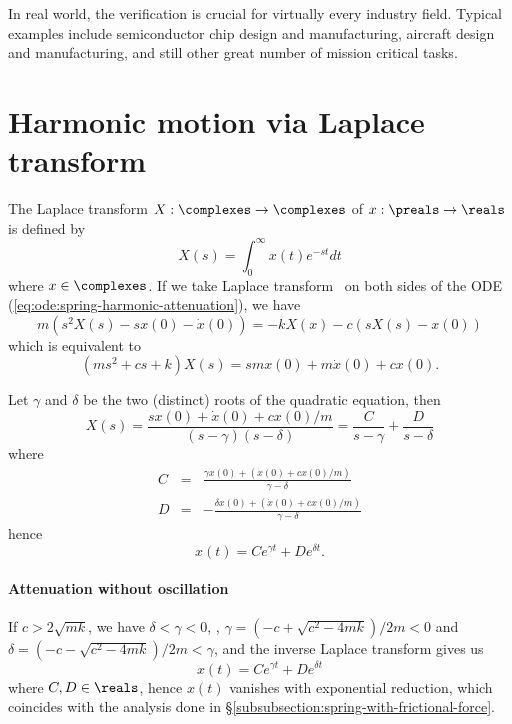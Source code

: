 \documentclass{article}
\begin{document}
In real world, the verification is crucial for virtually every industry field.
Typical examples include
semiconductor chip design and manufacturing,
aircraft design and manufacturing,
and still other great number of mission critical tasks.

\appendix
\section{Harmonic motion via Laplace transform}
\label{app:section:harmonic-motion-via-laplace-transform}

The Laplace transform $X:\complexes\to\complexes$ of $x:\preals\to\reals$ is defined by
\begin{equation}
X(s) = \int_{0}^\infty x(t) e^{-st} dt
\end{equation}
where $x\in\complexes$.
If we take Laplace transform~\cite{Laplace-transform} on both sides of the ODE (\ref{eq:ode:spring-harmonic-attenuation}),
we have
\[
	m (s^2X(s) -s x(0) - \dot{x}(0))
	=
	-kX(x)
	-c(sX(s) - x(0) )
\]
which is equivalent to
\begin{equation}
(ms^2 + cs + k ) X(s) = smx(0) + m\dot{x}(0) + cx(0).
\end{equation}

Let $\gamma$ and $\delta$ be the two (distinct) roots of the quadratic equation,
then
\[
X(s)
=
\frac{
sx(0) + \dot{x}(0) + cx(0)/m
}{
(s-\gamma)(s-\delta)
}
=
\frac{C}{s-\gamma}
+
\frac{D}{s-\delta}
\]
where
\begin{eqnarray*}
C &=&
\frac{
\gamma x(0) +(\dot{x}(0) + cx(0)/m)
}{
\gamma-\delta
}
\\
D &=&
-
\frac{
\delta x(0) +(\dot{x}(0) + cx(0)/m)
}{
\gamma-\delta
}
\end{eqnarray*}
hence
\[
x(t) = C e^{\gamma t} + D e^{\delta t}.
\]

\paragraph{Attenuation without oscillation}

If $c > 2\sqrt{mk}$,
we have $\delta < \gamma < 0$,
\ie,
$\gamma = (-c+\sqrt{c^2-4mk})/2m<0$
and
$\delta = (-c-\sqrt{c^2-4mk})/2m<\gamma$,
and
the inverse Laplace transform gives us
\begin{equation}
x(t) = Ce^{\gamma t} + De^{\delta t}
\end{equation}
where $C,D\in\reals$,
hence $x(t)$ vanishes with exponential reduction,
which coincides with the analysis done in \S\ref{subsubsection:spring-with-frictional-force}.
\end{document}
